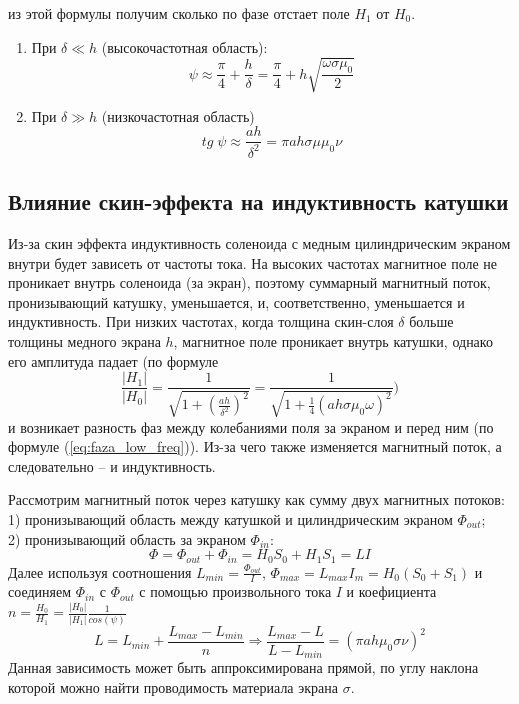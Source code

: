 \documentclass[a4paper,12pt]{extarticle}
\begin{document}
из этой формулы получим сколько по фазе отстает поле $H_1$ от $H_0$.
\begin{enumerate}
    \item При $\delta \ll h$
    (высокочастотная область): \\
    \begin{equation}
    \psi \approx \frac{\pi}{4} + \frac{h}{\delta} = 
    \frac{\pi}{4} + h \sqrt{\frac{\omega \sigma \mu_0}{2}}
    \label{eq:faza_high_freq}
    \end{equation}
    \item При $\delta \gg h$ (низкочастотная область) \\
    \begin{equation}
        tg\;\psi \approx \frac{ah}{\delta^2} = \pi a h \sigma \mu \mu_0 \nu
        \label{eq:faza_low_freq}
    \end{equation}

\end{enumerate}

\subsection*{Влияние скин-эффекта на индуктивность катушки}
Из-за скин эффекта индуктивность соленоида с медным цилиндрическим экраном
внутри будет зависеть от частоты тока. На высоких частотах магнитное поле не проникает внутрь соленоида (за экран), поэтому суммарный магнитный поток, пронизывающий катушку, уменьшается, и, соответственно, уменьшается и индуктивность. При низких частотах, когда толщина скин-слоя $\delta$ больше толщины медного экрана $h$, магнитное поле проникает внутрь катушки, однако его амплитуда падает (по формуле 
\begin{equation}    
\frac{|H_1|}{|H_0|} = \frac{1}{\sqrt{1 + \left(\frac{ah}{\delta^2} \right)^2}} = \frac{1}{\sqrt{1+ \frac{1}{4} (ah \sigma \mu_0 \omega)^2}})
    \label{eq:|H_0|/|H_1|}
\end{equation} и возникает разность фаз между колебаниями поля за экраном и перед ним (по формуле (\ref{eq:faza_low_freq})). Из-за чего также изменяется магнитный поток, а следовательно – и индуктивность.

Рассмотрим магнитный поток через катушку как сумму двух магнитных потоков:\\ 1) пронизывающий область между катушкой и цилиндрическим экраном $\Phi_{out}$;\\ 2) пронизывающий область за экраном $\Phi_{in}$:
\begin{equation}
    \Phi = \Phi_{out} + \Phi_{in} = H_0 S_0 + H_1 S_1 = LI
    \label{eq:potoki}
\end{equation}
Далее используя соотношения $L_{min} = \frac{\Phi_{out}}{I}$, $\Phi_{max} = L_{max}I_m = H_0(S_0 + S_1)$ и соединяем $\Phi_{in}$ с $\Phi_{out}$ с помощью произвольного тока $I$ и коефициента $n = \frac{H_0}{H_1} = \frac{|H_0|}{|H_1|} \frac{1}{cos(\psi)}$
\begin{equation}
    L = L_{min} + \frac{L_{max} - L_{min}}{n} \Rightarrow \frac{L_{max} - L}{L - L_{min}} = (\pi ah \mu_0 \sigma \nu)^2
    \label{eq:inductivnost}
\end{equation}
Данная зависимость может быть аппроксимирована прямой, по углу наклона которой можно найти проводимость материала экрана $\sigma$.
\newpage
\end{document}

